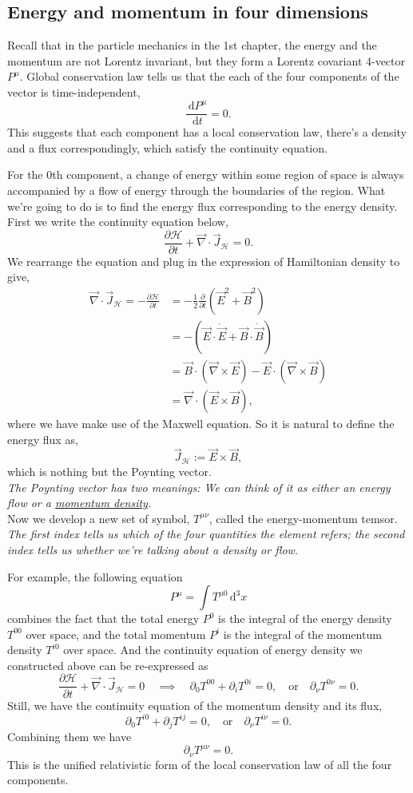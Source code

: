 \documentclass{article}
\newcommand{\be}{\begin{equation}}
\newcommand{\ee}{\end{equation}}
\newcommand{\bs}{\be\begin{split}}
\newcommand{\dif}{\,\mathrm{d}}
\newcommand{\p}{\partial}
\newcommand{\1}{\left}
\newcommand{\2}{\right}
\newcommand{\ma}{\mathcal}
\newcommand{\m}{\mu}
\newcommand{\n}{\nu}
\begin{document}
\subsection{Energy and momentum in four dimensions}

Recall that in the particle mechanics in the 1st chapter, the energy and the momentum are not Lorentz invariant, but they form a Lorentz covariant 4-vector $P^\m$. Global conservation law tells us that the each of the four components of the vector is time-independent,
\be
\frac{\dif P^\m} {\dif t}=0.
\ee
This suggests that each component has a local conservation law, there's a density and a flux correspondingly, which satisfy the continuity equation. 

For the 0th component, a change of energy within some region of space is always accompanied by a flow of energy through the boundaries of the region. What we're going to do is to find the energy flux corresponding to the energy density. First we write the continuity equation below,
\be
\frac{\p \ma H}{\p t} +\vec\nabla\cdot\vec J_{\ma H}=0.
\ee
We rearrange the equation and plug in the expression of Hamiltonian density to give,
\bs
\vec\nabla\cdot\vec J_{\ma H}= -\frac{\p \ma H}{\p t}&=- \frac1 2 \frac{\p}{\p t}(\vec E^2 + \vec B^2)\\
&=-(\vec E\cdot\dot{\vec E}+ \vec B\cdot\dot{\vec B})\\
&=\vec B\cdot(\vec\nabla\times\vec E)-\vec E\cdot(\vec\nabla\times\vec B)\\
&=\vec\nabla\cdot(\vec E\times\vec B),
\end{split}\ee
where we have make use of the Maxwell equation. So it is natural to define the energy flux as,
\be
\vec J_{\ma H}:=\vec E\times\vec B,
\ee
which is nothing but the Poynting vector.\\

\textit{The Poynting vector has two meanings: We can think of it as either an \emph{energy flow} or a \uline{momentum density}.}\\

Now we develop a new set of symbol, $T^{\m\n}$, called the energy-momentum temsor. \textit{The first index tells us which of the four quantities the element refers; the second index tells us whether we're talking about a density or flow.}

For example, the following equation
\be
P^\m=\int T^{\m 0} \dif^3 x
\ee
combines the fact that the total energy $P^0$ is the integral of the energy density $T^{00}$ over space, and the total momentum $P^i$ is the integral of the momentum density $T^{i0}$ over space. And the continuity equation of energy density we constructed above can be re-expressed as
\be
\frac{\p \ma H}{\p t} +\vec\nabla\cdot\vec J_{\ma H}=0 \quad\implies\quad \p_0 T^{00}+\p_i T^{0i} =0, \quad\text{or}\quad \p_\n T^{0\n} =0.
\ee
Still, we have the continuity equation of the momentum density and its flux,
\be
\p_0 T^{i0}+\p_j T^{ij} =0, \quad\text{or}\quad \p_\n T^{i\n} =0.
\ee
Combining them we have
\be
\p_\n T^{\m\n} =0.
\ee
This is the unified relativistic form of the local conservation law of all the four components.\\
\end{document}
